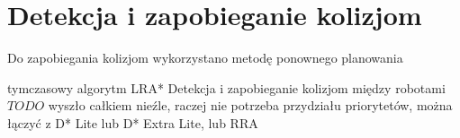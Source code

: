 \section{Detekcja i zapobieganie kolizjom}
\label{ch:alg-collision-avoid}


Do zapobiegania kolizjom wykorzystano metodę ponownego planowania 

tymczasowy algorytm
LRA*
Detekcja i zapobieganie kolizjom między robotami
$TODO$ wyszło całkiem nieźle, raczej nie potrzeba przydziału priorytetów, można łączyć z D* Lite lub D* Extra Lite, lub RRA